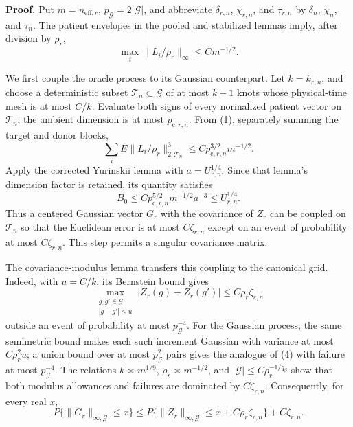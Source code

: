 \textbf{Proof.}
Put \(m=n_{\mathrm{eff},r}\), \(p_{\mathcal G}=2|\mathcal G|\), and abbreviate \(\delta_{r,n}\), \(\chi_{r,n}\), and \(\tau_{r,n}\) by \(\delta_n\), \(\chi_n\), and \(\tau_n\). The patient envelopes in the pooled and stabilized lemmas imply, after division by \(\rho_r\),
\[
 \max_i\|L_i/\rho_r\|_\infty\le Cm^{-1/2}.               \tag{1}
\]

We first couple the oracle process to its Gaussian counterpart. Let \(k=k_{r,n}\), and choose a deterministic subset \(\mathcal T_n\subset\mathcal G\) of at most \(k+1\) knots whose physical-time mesh is at most \(C/k\). Evaluate both signs of every normalized patient vector on \(\mathcal T_n\); the ambient dimension is at most \(p_{\mathrm c,r,n}\). From (1), separately summing the target and donor blocks,
\[
 \sum_iE\|L_i/\rho_r\|_{2,\mathcal T_n}^3
 \le Cp_{\mathrm c,r,n}^{3/2}m^{-1/2}.                    \tag{2}
\]
Apply the corrected Yurinskii lemma with \(a=U_{r,n}^{1/4}\). Since that lemma's dimension factor is retained, its quantity satisfies
\[
 B_0\le C p_{\mathrm c,r,n}^{5/2}m^{-1/2}a^{-3}
 \le U_{r,n}^{1/4}.                                      \tag{3}
\]
Thus a centered Gaussian vector \(G_r\) with the covariance of \(Z_r\) can be coupled on \(\mathcal T_n\) so that the Euclidean error is at most \(C\zeta_{r,n}\) except on an event of probability at most \(C\zeta_{r,n}\). This step permits a singular covariance matrix.

The covariance-modulus lemma transfers this coupling to the canonical grid. Indeed, with \(u=C/k\), its Bernstein bound gives
\[
 \max_{\substack{g,g'\in\mathcal G\\|g-g'|\le u}}
 |Z_r(g)-Z_r(g')|\le C\rho_r\zeta_{r,n}                  \tag{4}
\]
outside an event of probability at most \(p_{\mathcal G}^{-4}\). For the Gaussian process, the same semimetric bound makes each such increment Gaussian with variance at most \(C\rho_r^2u\); a union bound over at most \(p_{\mathcal G}^2\) pairs gives the analogue of (4) with failure at most \(p_{\mathcal G}^{-4}\). The relations \(k\asymp m^{1/9}\), \(\rho_r\asymp m^{-1/2}\), and \(|\mathcal G|\le C\rho_r^{-1/q_\beta}\) show that both modulus allowances and failures are dominated by \(C\zeta_{r,n}\). Consequently, for every real \(x\),
\[
 P\{\|G_r\|_{\infty,\mathcal G}\le x\}
 \le P\{\|Z_r\|_{\infty,\mathcal G}
 \le x+C\rho_r\zeta_{r,n}\}+C\zeta_{r,n}.              \tag{5}
\]


